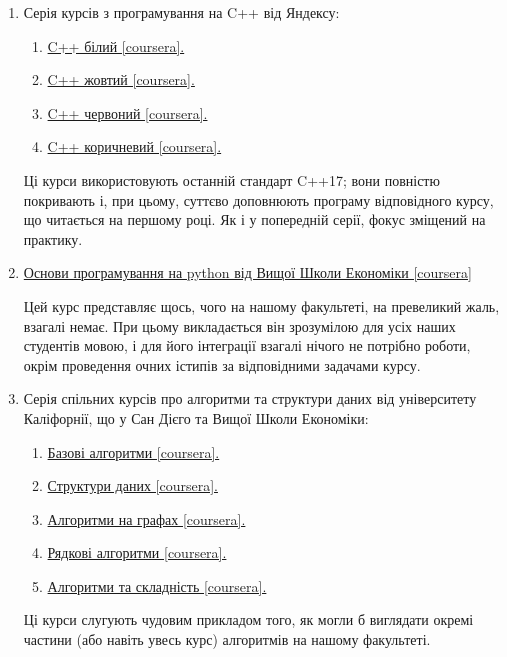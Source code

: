 \documentclass[14pt, a4paper]{extarticle}  %
\begin{document}
\begin{enumerate}
    \item Серія курсів з програмування на C++ від Яндексу:
    \begin{enumerate}
    	\item \href{https://www.coursera.org/learn/c-plus-plus-white/home/welcome}{C++ білий [coursera].}
    	\item \href{https://www.coursera.org/learn/c-plus-plus-yellow/home/welcome}{C++ жовтий [coursera].}
    	\item \href{https://www.coursera.org/learn/c-plus-plus-red/home/welcome}{C++ червоний [coursera].}
    	\item \href{https://www.coursera.org/learn/c-plus-plus-brown/home/welcome}{C++ коричневий [coursera].}
    \end{enumerate}
    Ці курси використовують останній стандарт C++17; вони повністю покривають і, при цьому, суттєво доповнюють програму відповідного курсу, що читається на першому році. Як і у попередній серії, фокус зміщений на практику.

    \item \href{https://www.coursera.org/learn/python-osnovy-programmirovaniya/home/welcome}{Основи програмування на python від Вищої Школи Економіки [coursera]} 
    
    Цей курс представляє щось, чого на нашому факультеті, на превеликий жаль, взагалі немає. При цьому викладається він зрозумілою для усіх наших студентів мовою, і для його інтеграції взагалі нічого не потрібно роботи, окрім проведення очних істипів за відповідними задачами курсу.

    \item Серія спільних курсів про алгоритми та структури даних від університету Каліфорнії, що у Сан Дієго та Вищої Школи Економіки:
    \begin{enumerate}
    	\item \href{https://www.coursera.org/learn/algorithmic-toolbox}{Базові алгоритми [coursera].}
    	\item \href{https://www.coursera.org/learn/data-structures}{Структури даних [coursera].}
    	\item \href{https://www.coursera.org/learn/algorithms-on-graphs}{Алгоритми на графах [coursera].}
    	\item \href{https://www.coursera.org/learn/algorithms-on-strings}{Рядкові алгоритми [coursera].}
    	\item \href{https://www.coursera.org/learn/advanced-algorithms-and-complexity}{Алгоритми та складність [coursera].}
    \end{enumerate}
    Ці курси слугують чудовим прикладом того, як могли б виглядати окремі частини (або навіть увесь курс) алгоритмів на нашому факультеті. 
  

\end{enumerate}
\end{document}

